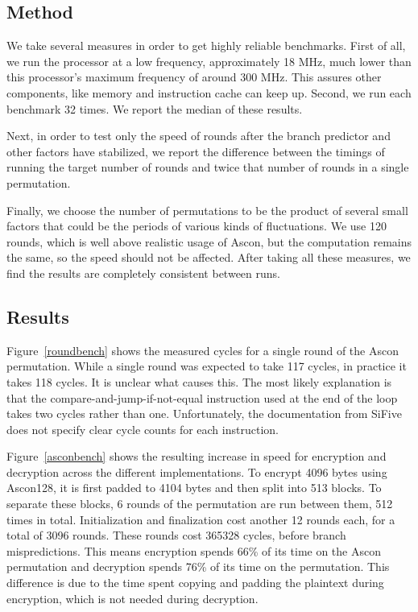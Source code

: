 \subsection{Method}

We take several measures in order to get highly reliable benchmarks. First of
all, we run the processor at a low frequency, approximately 18 MHz, much lower
than this processor's maximum frequency of around 300 MHz. This assures other
components, like memory and instruction cache can keep up. Second, we run each
benchmark 32 times. We report the median of these results.

Next, in order to test only the speed of rounds after the branch predictor and
other factors have stabilized, we report the difference between the timings of
running the target number of rounds and twice that number of rounds in a single
permutation.

Finally, we choose the number of permutations to be the product of several small
factors that could be the periods of various kinds of fluctuations. We use 120
rounds, which is well above realistic usage of Ascon, but the computation
remains the same, so the speed should not be affected. After taking all these
measures, we find the results are completely consistent between runs.

\subsection{Results}

Figure~\ref{roundbench} shows the measured cycles for a single round of the Ascon
permutation. While a single round was expected to take 117 cycles, in practice
it takes 118 cycles. It is unclear what causes this. The most likely explanation
is that the compare-and-jump-if-not-equal instruction used at the end of the
loop takes two cycles rather than one. Unfortunately, the documentation from
SiFive does not specify clear cycle counts for each instruction.

Figure~\ref{asconbench} shows the resulting increase in speed for encryption and
decryption across the different implementations. To encrypt 4096 bytes using
Ascon128, it is first padded to 4104 bytes and then split into 513 blocks. To
separate these blocks, 6 rounds of the permutation are run between them, 512
times in total. Initialization and finalization cost another 12 rounds each, for
a total of 3096 rounds. These rounds cost 365328 cycles, before branch
mispredictions. This means encryption spends 66\% of its time on the Ascon
permutation and decryption spends 76\% of its time on the permutation. This
difference is due to the time spent copying and padding the plaintext during
encryption, which is not needed during decryption.

